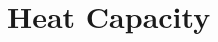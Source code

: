 \documentclass[12pt,aspectratio=169,dvipsnames]{beamer}
\begin{document}
%
%    
%      
%      
%



\section{Heat Capacity}
\end{document}
